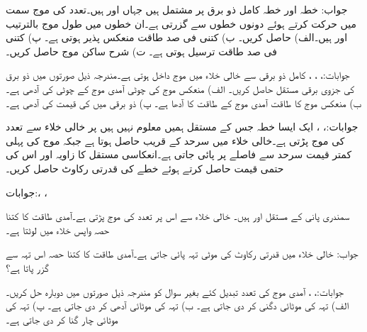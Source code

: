 جواب:
خطہ  اور خطہ  کامل ذو برق پر مشتمل ہیں جہاں  اور  ہیں۔تعدد  کی موج  سمت میں حرکت کرتے ہوئے دونوں خطوں سے گزرتی ہے۔ان خطوں میں طول موج بالترتیب  اور  ہیں۔الف)  حاصل کریں۔ ب) کتنی فی صد طاقت منعکس پذیر ہوتی ہے۔ پ) کتنی فی صد طاقت ترسیل ہوتی ہے۔ ت) شرح ساکن موج  حاصل کریں۔

جوابات:، ، ، 
کامل ذو برقی  سے خالی خلاء میں موج داخل ہوتی ہے۔مندرجہ ذیل صورتوں میں ذو برق کی جزوی برقی مستقل  حاصل کریں۔ الف) منعکس موج کی چوٹی آمدی موج کے چوٹی کی آدھی ہے۔ ب) منعکس موج کا طاقت آمدی موج کے طاقت کا آدھا ہے۔ پ) ذو برقی میں  کی قیمت  کی آدھی ہے۔

جوابات:، ، 
ایک ایسا خطہ جس کے مستقل ہمیں معلوم نہیں ہیں پر خالی خلاء سے  تعدد کی موج پڑتی ہے۔خالی خلاء میں سرحد کے قریب  حاصل ہوتا ہے جبکہ موج کی پہلی کمتر قیمت سرحد سے  فاصلے پر پائی جاتی ہے۔انعکاسی مستقل کا زاویہ  اور اس کی حتمی قیمت  حاصل کرتے ہوئے خطے کی قدرتی رکاوٹ حاصل کریں۔

جوابات:، ،    

سمندری پانی کے مستقل  اور  ہیں۔ خالی خلاء سے اس پر  تعدد کی موج پڑتی ہے۔آمدی طاقت کا کتنا حصہ واپس خلاء میں لوٹتا ہے۔

جواب: 
خالی خلاء میں  قدرتی رکاوٹ کی  موٹی تہہ پائی جاتی ہے۔آمدی طاقت کا کتنا حصہ اس تہہ سے گزر پاتا ہے؟ 

جوابات:، ،  
آمدی موج کی تعدد تبدیل کئے بغیر سوال  کو مندرجہ ذیل صورتوں میں دوبارہ حل کریں۔ الف) تہہ کی موٹائی دگنی کر دی جاتی ہے۔ ب) تہہ کی موٹائی آدھی کر دی جاتی ہے۔ پ) تہہ کی موٹائی  چار گنا کر دی جاتی ہے۔

